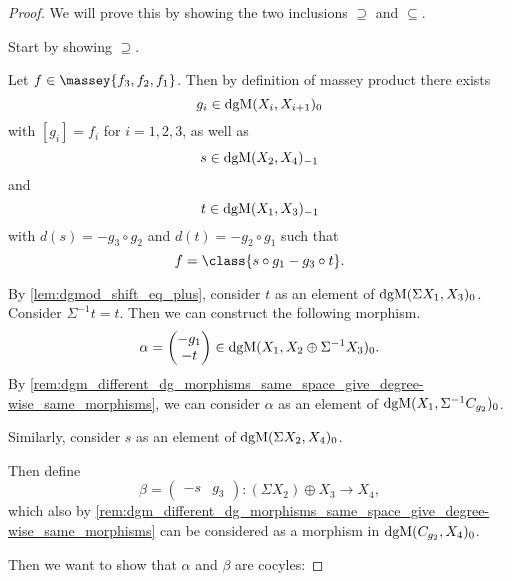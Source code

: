 \begin{proof}
    We will prove this by showing the two inclusions \( \supseteq \) and \( \subseteq \).

    Start by showing \( \supseteq \).

    Let \( f \in \massey{f_3, f_2, f_1} \). Then by definition of massey product there exists
    \[
        g_i \in \operatorname{dgM}(X_i, X_{i + 1})_0
    \]
    with \( [g_i] = f_i \) for \( i = 1, 2, 3 \), as well as
    \[
        s \in \operatorname{dgM}(X_2, X_4)_{-1}
    \]
    and
    \[
        t \in \operatorname{dgM}(X_1, X_3)_{-1}
    \]
    with \( d(s) = - g_3 \circ g_2 \) and \( d(t) = - g_2 \circ g_1 \) such that
    \[
        f = \class{s \circ g_1 - g_3 \circ t}.
    \]

    By \autoref{lem:dgmod_shift_eq_plus}, consider \( t \) as an element of \( \operatorname{dgM}(\Sigma X_1, X_3)_0 \). Consider \( \Sigma^{-1} t = t \). Then we can construct the following morphism.
    \[
        \alpha =
        \begin{pmatrix}
            - g_1 \\
            - t
        \end{pmatrix}
        \in \operatorname{dgM}(X_1, X_2 \oplus \Sigma^{-1} X_3)_0.
    \]
    By \autoref{rem:dgm_different_dg_morphisms_same_space_give_degree-wise_same_morphisms}, we can consider \( \alpha \) as an element of \( \operatorname{dgM}(X_1, \Sigma^{-1} C_{g_2})_0 \).

    Similarly, consider \( s \) as an element of \( \operatorname{dgM}(\Sigma X_2, X_4)_0 \).

    Then define
    \[
        \beta =
        \begin{pmatrix}
            - s & g_3
        \end{pmatrix}
        : (\Sigma X_2) \oplus X_3 \to X_4,
    \]
    which also by \autoref{rem:dgm_different_dg_morphisms_same_space_give_degree-wise_same_morphisms} can be considered as a morphism in \( \operatorname{dgM}(C_{g_2}, X_4)_0 \).

    Then we want to show that \( \alpha \) and \( \beta \) are cocyles:


\end{proof}
